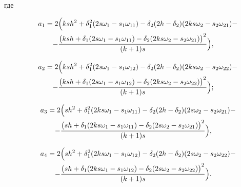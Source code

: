 где

\begin{multline}

\label{rom4}

~~~~a_1=2\Bigl(

ksh^2+\delta_1^2(2s\omega_1-s_1\omega_{11})-\delta_2(2h-\delta_2)(2ks\omega_2-s_2\omega_{21})-

\\

-

\frac{

\bigl(ksh+\delta_1(2s\omega_1-s_1\omega_{11})-\delta_2(2ks\omega_2-s_2\omega_{21})\bigr)^2}{(k+1)s}

\Bigr),

\end{multline}

\begin{multline}

\label{rom7}

~~~~a_2=2\Bigl( ksh^2+\delta_1^2(2s\omega_1-s_1\omega_{12})-\delta_2(2h-\delta_2)(2ks\omega_2-s_2\omega_{22})-

\\

-\frac{\bigl(ksh+\delta_1(2s\omega_1-s_1\omega_{12})-\delta_2(2ks\omega_2-s_2\omega_{22})\bigr)^2}{(k+1)s}

\Bigr);

\end{multline}

\begin{multline}

\label{rom7}

~~~~a_3=2 \Bigl( sh^2+\delta_1^2(2ks\omega_1-s_1\omega_{11})-\delta_2(2h-\delta_2)(2s\omega_2-s_2\omega_{21})-

\\

-\frac{\bigl(sh+\delta_1(2ks\omega_1-s_1\omega_{11})-\delta_2(2s\omega_2-s_2\omega_{21})\bigr)^2}{(k+1)s}\Bigr),

\end{multline}

\begin{multline}

\label{rom7}

~~~~a_4=2\Bigl(sh^2+\delta_1^2(2ks\omega_1-s_1\omega_{12})-\delta_2(2h-\delta_2)(2s\omega_2-s_2\omega_{22})-

\\

-\frac{\bigl(sh+\delta_1(2ks\omega_1-s_1\omega_{12})-\delta_2(2s\omega_2-s_2\omega_{22})\bigr)^2}{(k+1)s}\Bigr).

\end{multline}



